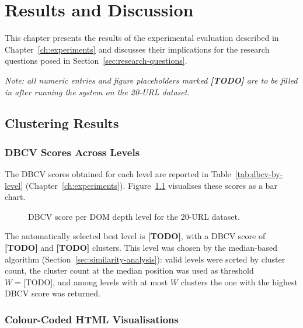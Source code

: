 \chapter{Results and Discussion}
\label{ch:results}

This chapter presents the results of the experimental evaluation described in Chapter~\ref{ch:experiments} and discusses their implications for the research questions posed in Section~\ref{sec:research-questions}.

\textit{Note: all numeric entries and figure placeholders marked \textbf{[TODO]} are to be filled in after running the system on the 20-URL dataset.}

\section{Clustering Results}
\label{sec:clustering-results}

\subsection{DBCV Scores Across Levels}

The DBCV scores obtained for each level are reported in Table~\ref{tab:dbcv-by-level} (Chapter~\ref{ch:experiments}). Figure~\ref{fig:dbcv-bar} visualises these scores as a bar chart.

\begin{figure}[htbp]
    \centering
    \caption{DBCV score per DOM depth level for the 20-URL dataset.}
    \label{fig:dbcv-bar}
\end{figure}

The automatically selected best level is \textbf{[TODO]}, with a DBCV score of \textbf{[TODO]} and \textbf{[TODO]} clusters. This level was chosen by the median-based algorithm (Section~\ref{sec:similarity-analysis}): valid levels were sorted by cluster count, the cluster count at the median position was used as threshold $W = \text{[TODO]}$, and among levels with at most $W$ clusters the one with the highest DBCV score was returned.

\subsection{Colour-Coded HTML Visualisations}

